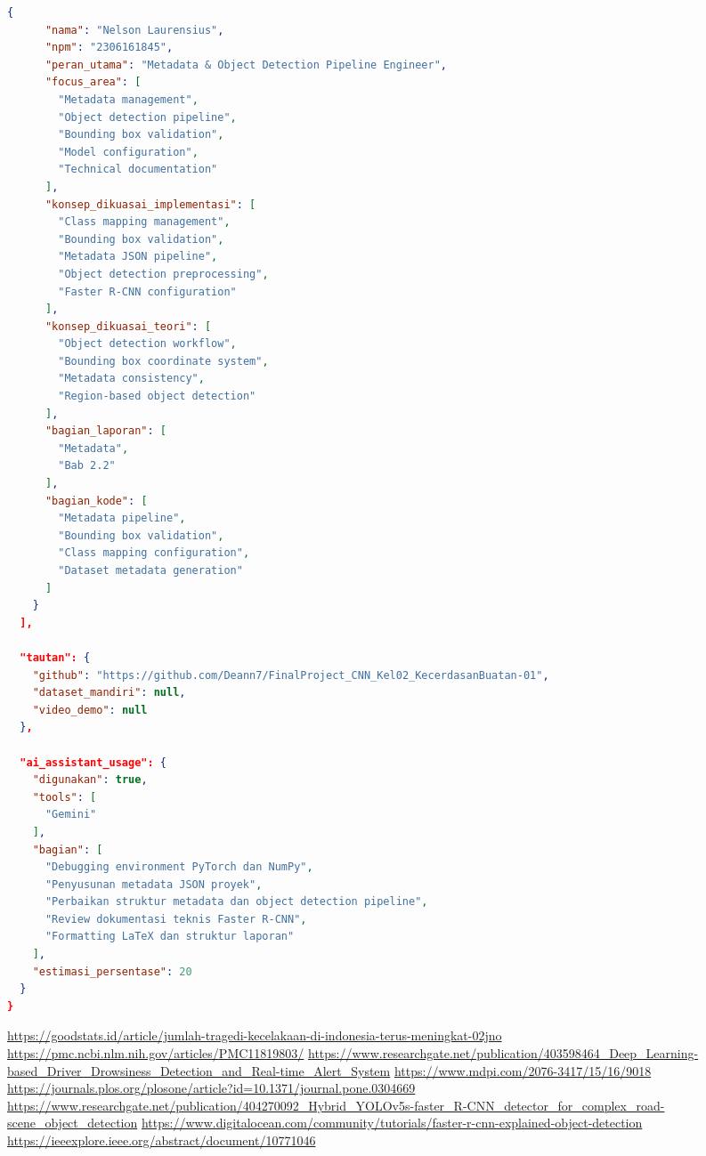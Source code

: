 \documentclass[11pt,a4paper,oneside]{report}
\begin{document}
\begin{lstlisting}[language=json]
    {
      "nama": "Nelson Laurensius",
      "npm": "2306161845",
      "peran_utama": "Metadata & Object Detection Pipeline Engineer",
      "focus_area": [
        "Metadata management",
        "Object detection pipeline",
        "Bounding box validation",
        "Model configuration",
        "Technical documentation"
      ],
      "konsep_dikuasai_implementasi": [
        "Class mapping management",
        "Bounding box validation",
        "Metadata JSON pipeline",
        "Object detection preprocessing",
        "Faster R-CNN configuration"
      ],
      "konsep_dikuasai_teori": [
        "Object detection workflow",
        "Bounding box coordinate system",
        "Metadata consistency",
        "Region-based object detection"
      ],
      "bagian_laporan": [
        "Metadata",
        "Bab 2.2"
      ],
      "bagian_kode": [
        "Metadata pipeline",
        "Bounding box validation",
        "Class mapping configuration",
        "Dataset metadata generation"
      ]
    }
  ],

  "tautan": {
    "github": "https://github.com/Deann7/FinalProject_CNN_Kel02_KecerdasanBuatan-01",
    "dataset_mandiri": null,
    "video_demo": null
  },

  "ai_assistant_usage": {
    "digunakan": true,
    "tools": [
      "Gemini"
    ],
    "bagian": [
      "Debugging environment PyTorch dan NumPy",
      "Penyusunan metadata JSON proyek",
      "Perbaikan struktur metadata dan object detection pipeline",
      "Review dokumentasi teknis Faster R-CNN",
      "Formatting LaTeX dan struktur laporan"
    ],
    "estimasi_persentase": 20
  }
}
\end{lstlisting}

\renewcommand{\bibname}{Referensi}

\begin{thebibliography}{00}

 \url{https://goodstats.id/article/jumlah-tragedi-kecelakaan-di-indonesia-terus-meningkat-02jno}
 \url{https://pmc.ncbi.nlm.nih.gov/articles/PMC11819803/}
 \url{https://www.researchgate.net/publication/403598464_Deep_Learning-based_Driver_Drowsiness_Detection_and_Real-time_Alert_System}
 \url{https://www.mdpi.com/2076-3417/15/16/9018}
 \url{https://journals.plos.org/plosone/article?id=10.1371/journal.pone.0304669}
  \url{https://www.researchgate.net/publication/404270092_Hybrid_YOLOv5s-faster_R-CNN_detector_for_complex_road-scene_object_detection}
 \url{https://www.digitalocean.com/community/tutorials/faster-r-cnn-explained-object-detection}
 \url{https://ieeexplore.ieee.org/abstract/document/10771046}

\end{thebibliography}
\end{document}
